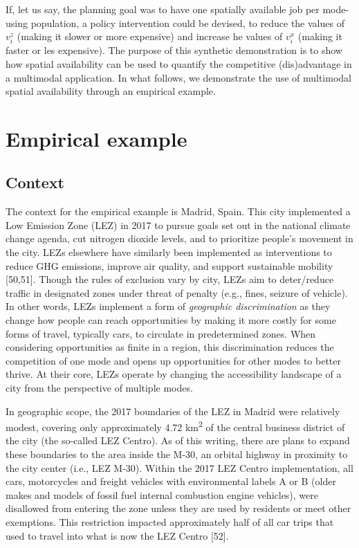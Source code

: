 \documentclass[10pt,letterpaper]{article}
\begin{document}
If, let us say, the planning goal was to have one spatially available
job per mode-using population, a policy intervention could be devised,
to reduce the values of \(v_i^z\) (making it slower or more expensive)
and increase he values of \(v_i^x\) (making it faster or les expensive).
The purpose of this synthetic demonstration is to show how spatial
availability can be used to quantify the competitive (dis)advantage in a
multimodal application. In what follows, we demonstrate the use of
multimodal spatial availability through an empirical example.

\hypertarget{empirical-example}{%
\section{Empirical example}\label{empirical-example}}

\hypertarget{context}{%
\subsection{Context}\label{context}}

The context for the empirical example is Madrid, Spain. This city
implemented a Low Emission Zone (LEZ) in 2017 to pursue goals set out in
the national climate change agenda, cut nitrogen dioxide levels, and to
prioritize people's movement in the city. LEZs elsewhere have similarly
been implemented as interventions to reduce GHG emissions, improve air
quality, and support sustainable mobility {[}50,51{]}. Though the rules
of exclusion vary by city, LEZs aim to deter/reduce traffic in
designated zones under threat of penalty (e.g., fines, seizure of
vehicle). In other words, LEZs implement a form of \emph{geographic
discrimination} as they change how people can reach opportunities by
making it more costly for some forms of travel, typically cars, to
circulate in predetermined zones. When considering opportunities as
finite in a region, this discrimination reduces the competition of one
mode and opens up opportunities for other modes to better thrive. At
their core, LEZs operate by changing the accessibility landscape of a
city from the perspective of multiple modes.

In geographic scope, the 2017 boundaries of the LEZ in Madrid were
relatively modest, covering only approximately 4.72
km\textsuperscript{2} of the central business district of the city (the
so-called LEZ Centro). As of this writing, there are plans to expand
these boundaries to the area inside the M-30, an orbital highway in
proximity to the city center (i.e., LEZ M-30). Within the 2017 LEZ
Centro implementation, all cars, motorcycles and freight vehicles with
environmental labels A or B (older makes and models of fossil fuel
internal combustion engine vehicles), were disallowed from entering the
zone unless they are used by residents or meet other exemptions. This
restriction impacted approximately half of all car trips that used to
travel into what is now the LEZ Centro {[}52{]}.
\end{document}
